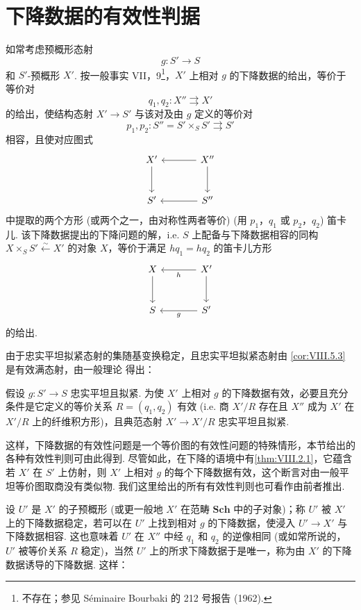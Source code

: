 \section{下降数据的有效性判据}

如常考虑预概形态射
\[
g \colon S' \longrightarrow S
\]
和 $S'$-预概形 $X'$. 按一般事实 VII，9\footnote{不存在；参见 Séminaire Bourbaki 的 212 号报告 (1962).}，$X'$ 上相对 $g$ 的下降数据的给出，等价于等价对 \cite{exp08-3}
\[
q_1, q_2 \colon X'' \rightrightarrows X'
\]
的给出，使结构态射 $X' \to S'$ 与该对及由 $g$ 定义的等价对
\[
p_1, p_2 \colon S'' = S' \times_S S' \rightrightarrows S'
\]
相容，且使对应图式
\[
\begin{tikzcd}[row sep=large, column sep=large]
X' \arrow[d] & X'' \arrow[l] \arrow[d] \\
S' & S'' \arrow[l]
\end{tikzcd}
\]
中提取的两个方形 (或两个之一，由对称性两者等价) (用 $p_1$，$q_1$ 或 $p_2$，$q_2$) 笛卡儿. 该下降数据提出的下降问题的解，i.e. $S$ 上配备与下降数据相容的同构 $X \times_S S' \xleftarrow{\sim} X'$ 的对象 $X$，等价于满足 $h q_1 = h q_2$ 的笛卡儿方形
\[
\begin{tikzcd}[row sep=large, column sep=large]
X \arrow[d] & X' \arrow[l,"h"] \arrow[d] \\
S & S' \arrow[l,"g"]
\end{tikzcd}
\]
的给出.

由于忠实平坦拟紧态射的集随基变换稳定，且忠实平坦拟紧态射由 \ref{cor:VIII.5.3} 是有效满态射，由一般理论 \cite{exp08-D} 得出：

\begin{proposition}\label{prop:VIII.7.1}
假设 $g \colon S' \to S$ 忠实平坦且拟紧. 为使 $X'$ 上相对 $g$ 的下降数据有效，必要且充分条件是它定义的等价关系 $R = (q_1, q_2)$ 有效 (i.e. 商 $X'/R$ 存在且 $X''$ 成为 $X'$ 在 $X'/R$ 上的纤维积方形)，且典范态射 $X' \to X'/R$ 忠实平坦且拟紧.
\end{proposition}

这样，下降数据的有效性问题是一个等价图的有效性问题的特殊情形，本节给出的各种有效性判则可由此得到. 尽管如此，在下降的语境中有\cref{thm:VIII.2.1}，它蕴含若 $X'$ 在 $S'$ 上仿射，则 $X'$ 上相对 $g$ 的每个下降数据有效，这个断言对由一般平坦等价图取商没有类似物. 我们这里给出的所有有效性判则也可看作由前者推出.

设 $U'$ 是 $X'$ 的子预概形 (或更一般地 $X'$ 在范畴 $\mathbf{Sch}$ 中的子对象)；称 $U'$ 被 $X'$ 上的下降数据稳定，若可以在 $U'$ 上找到相对 $g$ 的下降数据，使浸入 $U' \to X'$ 与下降数据相容. 这也意味着 $U'$ 在 $X''$ 中经 $q_1$ 和 $q_2$ 的逆像相同 (或如常所说的，$U'$ 被等价关系 $R$ 稳定)，当然 $U'$ 上的所求下降数据于是唯一，称为由 $X'$ 的下降数据诱导的下降数据. 这样：

